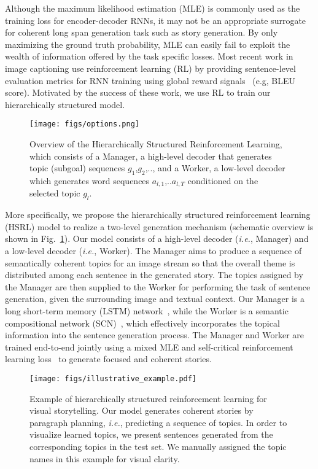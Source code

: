 \documentclass[letterpaper]{article} \usepackage{aaai19}  \usepackage{times}  \usepackage{helvet}  \usepackage{courier}  \usepackage{url}  \usepackage{graphicx}
\begin{document}
Although the maximum likelihood estimation (MLE) is commonly used as the training loss for encoder-decoder RNNs, it may not be an appropriate surrogate for coherent long span generation task such as story generation. By only maximizing the ground truth probability, MLE can easily fail to exploit the wealth of information offered by the task specific losses. Most recent work in image captioning use reinforcement learning (RL) by providing sentence-level evaluation metrics for RNN training using global reward signals~\cite{Rennie2016Self,ren2017deep,liu2016improved} (e.g, BLEU score). Motivated by the success of these work, we use RL to train our hierarchically structured model.

\begin{figure}[t]
	\centering
	\texttt{[image: figs/options.png]}
	\caption{\small Overview of the Hierarchically Structured Reinforcement Learning, which consists of a Manager, a high-level decoder that generates topic (subgoal) sequences {$g_1$,$g_2$,..}, and a Worker, a low-level decoder which generates word sequences $a_{l,1}$,..$a_{l,T}$ conditioned on the selected topic $g_l$.}
	\label{fig:overview_hrl_agent}	
\end{figure}

More specifically, we propose the hierarchically structured reinforcement learning (HSRL) model to realize a two-level generation mechanism (schematic overview is shown in Fig.~\ref{fig:overview_hrl_agent}). Our model consists of a high-level decoder (\emph{i.e.}, Manager) and a low-level decoder (\emph{i.e.}, Worker). The Manager aims to produce a sequence of semantically coherent topics for an image stream so that the overall theme is distributed among each sentence in the generated story. The topics assigned by the Manager are then supplied to the Worker for performing the task of sentence generation, given the surrounding image and textual context. Our Manager is a long short-term memory (LSTM) network~\cite{hochreiter1997long}, while the Worker is a semantic compositional network (SCN)~\cite{SCN_CVPR2017}, which effectively incorporates the topical information into the sentence generation process. The Manager and Worker are trained end-to-end jointly using a mixed MLE and self-critical reinforcement learning loss~\cite{Rennie2016Self} to generate focused and coherent stories. 

\begin{figure*}[t!]
	\centering
	\texttt{[image: figs/illustrative\_example.pdf]}
	\caption{Example of hierarchically structured reinforcement learning for visual storytelling. Our model generates coherent stories by paragraph planning, \emph{i.e.}, predicting a sequence of topics. In order to visualize learned topics, we present sentences generated from the corresponding topics in the test set. We manually assigned the topic names in this example for visual clarity.
		\small }
	\vspace{-1mm}
	\label{fig:framework}
\end{figure*}
\end{document}
